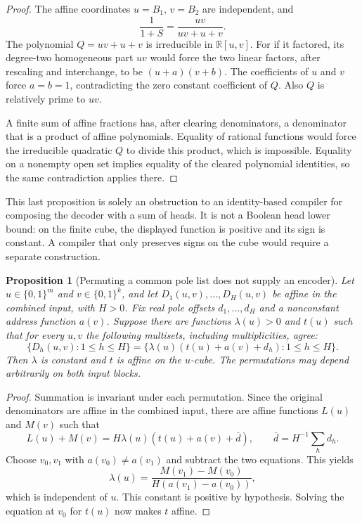 \documentclass[11pt]{article}
\newtheorem{proposition}{Proposition}
\begin{document}
\begin{proof}
The affine coordinates $u=B_1$, $v=B_2$ are independent, and
\[
 \frac1{1+S}=\frac{uv}{uv+u+v}.
\]
The polynomial $Q=uv+u+v$ is irreducible in $\mathbb R[u,v]$.
For if it factored, its degree-two homogeneous part $uv$ would force
the two linear factors, after rescaling and interchange, to be
$(u+a)(v+b)$. The coefficients of $u$ and $v$ force $a=b=1$,
contradicting the zero constant coefficient of $Q$.
Also $Q$ is relatively prime to $uv$.

A finite sum of affine fractions has, after clearing denominators,
a denominator that is a product of affine polynomials. Equality of
rational functions would force the irreducible quadratic $Q$ to
divide this product, which is impossible. Equality on a nonempty
open set implies equality of the cleared polynomial identities,
so the same contradiction applies there.
\end{proof}

This last proposition is solely an obstruction to an identity-based
compiler for composing the decoder with a sum of heads. It is not a
Boolean head lower bound: on the finite cube, the displayed function
is positive and its sign is constant. A compiler that only preserves
signs on the cube would require a separate construction.


\begin{proposition}[Permuting a common pole list does not supply an encoder]
Let $u\in\{0,1\}^m$ and $v\in\{0,1\}^k$, and let
$D_1(u,v),\ldots,D_H(u,v)$ be affine in the combined input, with $H>0$.
Fix real pole offsets $d_1,\ldots,d_H$ and a nonconstant address function
$a(v)$. Suppose there are functions $\lambda(u)>0$ and $t(u)$ such that
for every $u,v$ the following multisets, including multiplicities, agree:
\[
 \{D_h(u,v):1\le h\le H\}
   =\{\lambda(u)(t(u)+a(v)+d_h):1\le h\le H\}.
\]
Then $\lambda$ is constant and $t$ is affine on the $u$-cube.
The permutations may depend arbitrarily on both input blocks.
\end{proposition}
\begin{proof}
Summation is invariant under each permutation. Since the original
denominators are affine in the combined input, there are affine functions
$L(u)$ and $M(v)$ such that
\[
 L(u)+M(v)=H\lambda(u)(t(u)+a(v)+\overline d),
 \qquad \overline d=H^{-1}\sum_h d_h.
\]
Choose $v_0,v_1$ with $a(v_0)\ne a(v_1)$ and subtract the two equations.
This yields
\[
 \lambda(u)=\frac{M(v_1)-M(v_0)}{H(a(v_1)-a(v_0))},
\]
which is independent of $u$. This constant is positive by hypothesis.
Solving the equation at $v_0$ for $t(u)$ now makes $t$ affine.
\end{proof}
\end{document}
